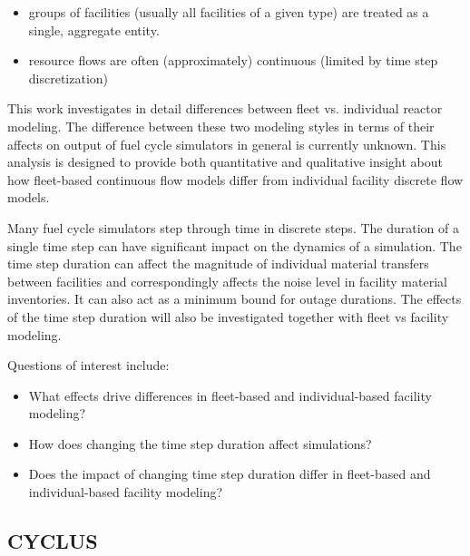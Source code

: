 \documentclass{style}
\begin{document}
\begin{itemize}

    \item groups of facilities (usually all facilities of a given type) are
    treated as a single, aggregate entity.

    \item resource flows are often (approximately) continuous (limited by time
        step discretization)

\end{itemize}

This work investigates in detail differences between fleet vs. individual
reactor modeling.  The difference between these two modeling styles in terms
of their affects on output of fuel cycle simulators in general is currently
unknown. This analysis is designed to provide both quantitative and
qualitative insight about how fleet-based continuous flow models differ from
individual facility discrete flow models.

Many fuel cycle simulators step through time in discrete steps.  The duration
of a single time step can have significant impact on the dynamics of a
simulation.  The time step duration can affect the magnitude of individual
material transfers between facilities and correspondingly affects the noise
level in facility material inventories.  It can also act as a minimum bound
for outage durations. The effects of the time step duration will also be
investigated together with fleet vs facility modeling.

Questions of interest include:

\begin{itemize}

    \item What effects drive differences in fleet-based and individual-based
        facility modeling?

    \item How does changing the time step duration affect simulations?

    \item Does the impact of changing time step duration differ in fleet-based
        and individual-based facility modeling?

\end{itemize}

\subsection{CYCLUS}
\end{document}
